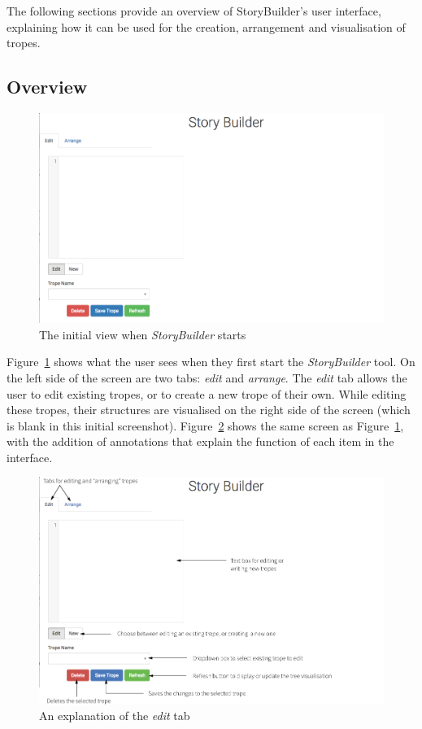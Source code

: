 \documentclass[11pt]{report}
\begin{document}
The following sections provide an overview of StoryBuilder's user interface,
explaining how it can be used for the creation, arrangement and visualisation of tropes.

\subsection{Overview}

\begin{figure}[!ht]
\centerline{\includegraphics[width=\textwidth]{storybuilder5.png}}
\caption{The initial view when \emph{StoryBuilder} starts}\label{fig:sb-start}
\end{figure}

Figure~\ref{fig:sb-start} shows what the user sees when they first start the
\emph{StoryBuilder} tool. On the left side of the screen are two tabs:
\emph{edit} and \emph{arrange}. The \emph{edit} tab allows the user to edit
existing tropes, or to create a new trope of their own. While editing these
tropes, their structures are visualised on the right side of the screen (which
is blank in this initial screenshot). Figure~\ref{fig:sb-edit-ann} shows the
same screen as Figure~\ref{fig:sb-start}, with the addition of annotations that
explain the function of each item in the interface.

\begin{figure}[!ht]
\centerline{\includegraphics[width=\textwidth]{storybuilder-a1.png}}
\caption{An explanation of the \emph{edit} tab}\label{fig:sb-edit-ann}
\end{figure}
\end{document}
